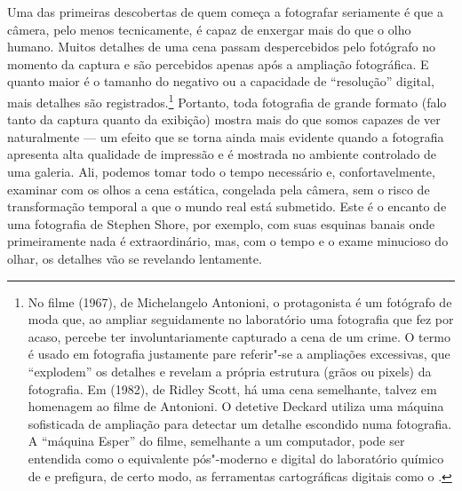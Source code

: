 Uma das primeiras descobertas de quem começa a fotografar seriamente é
que a câmera, pelo menos tecnicamente, é capaz de enxergar mais do que o
olho humano. Muitos detalhes de uma cena passam despercebidos pelo
fotógrafo no momento da captura e são percebidos apenas após a ampliação
fotográfica. E quanto maior é o tamanho do negativo ou a capacidade de
``resolução'' digital, mais detalhes são registrados.\footnote{No filme
  {} (1967), de Michelangelo Antonioni, o protagonista é um
  fotógrafo de moda que, ao ampliar seguidamente no laboratório uma
  fotografia que fez por acaso, percebe ter involuntariamente capturado
  a cena de um crime. O termo {} é usado em fotografia
  justamente pare referir"-se a ampliações excessivas, que ``explodem''
  os detalhes e revelam a própria estrutura (grãos ou pixels) da
  fotografia. Em {} (1982), de Ridley Scott, há uma
  cena semelhante, talvez em homenagem ao filme de Antonioni. O detetive
  Deckard utiliza uma máquina sofisticada de ampliação para detectar um
  detalhe escondido numa fotografia. A ``máquina Esper'' do filme,
  semelhante a um computador, pode ser entendida como o equivalente
  pós"-moderno e digital do laboratório químico de {} e
  prefigura, de certo modo, as ferramentas cartográficas digitais como o
  {}.} Portanto, toda fotografia de grande formato
(falo tanto da captura quanto da exibição) mostra mais do que somos capazes de ver naturalmente --- um efeito que se torna ainda mais evidente
quando a fotografia apresenta alta qualidade de impressão e é mostrada
no ambiente controlado de uma galeria. Ali, podemos tomar todo o tempo
necessário e, confortavelmente, examinar com os olhos a cena estática,
congelada pela câmera, sem o risco de transformação temporal a que o
mundo real está submetido. Este é o encanto de uma fotografia de Stephen
Shore, por exemplo, com suas esquinas banais onde primeiramente nada é
extraordinário, mas, com o tempo e o exame minucioso do olhar, os
detalhes vão se revelando lentamente.

